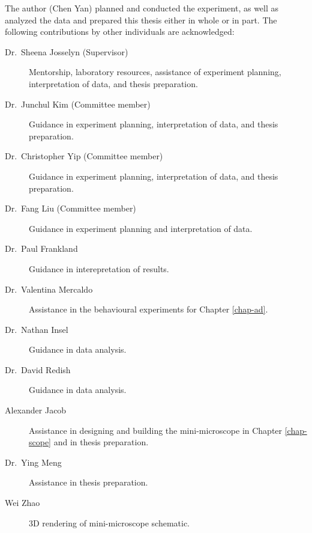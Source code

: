 The author (Chen Yan) planned and conducted the experiment, as well as analyzed the data and prepared this thesis either in whole or in part. The following contributions by other individuals are acknowledged:
\begin{description}

\item[Dr.~Sheena Josselyn (Supervisor)] Mentorship, laboratory resources, assistance of experiment planning, interpretation of data, and thesis preparation.

\item[Dr.~Junchul Kim (Committee member)] Guidance in experiment planning, interpretation of data, and thesis preparation.

\item[Dr.~Christopher Yip (Committee member)] Guidance in experiment planning, interpretation of data, and thesis preparation.
\item[Dr.~Fang Liu (Committee member)] Guidance in experiment planning and interpretation of data.

\item[Dr.~Paul Frankland] Guidance in interepretation of results.

\item[Dr.~Valentina Mercaldo] Assistance in the behavioural experiments for Chapter \ref{chap-ad}.

\item[Dr.~Nathan Insel] Guidance in data analysis.

\item[Dr.~David Redish] Guidance in data analysis. 

\item[Alexander Jacob] Assistance in designing and building the mini-microscope in Chapter \ref{chap-scope} and in thesis preparation.
\item[Dr.~Ying Meng] Assistance in thesis preparation.
\item[Wei Zhao] 3D rendering of mini-microscope schematic.



\end{description}

